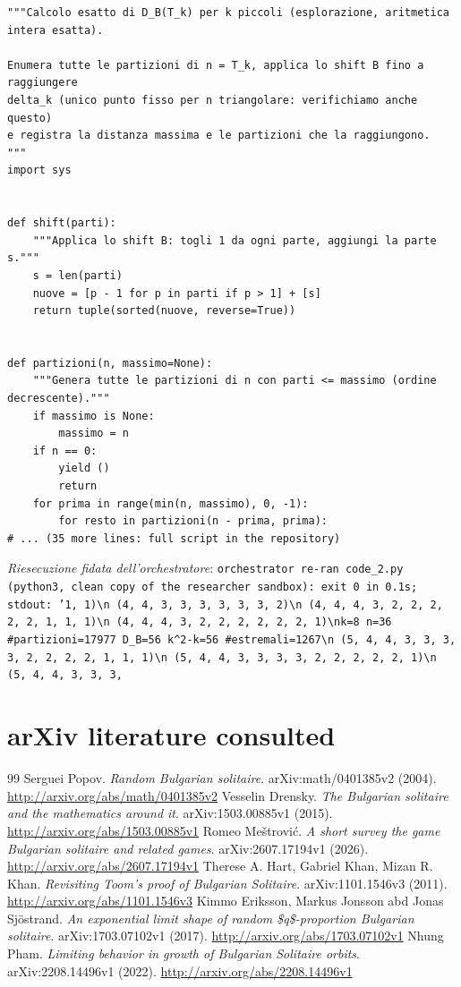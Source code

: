 \documentclass[11pt,a4paper]{article}
\begin{document}
\begin{lstlisting}[caption={attempt\_002 code\_2 [python, rigore exact] — Exhaustive exact computation of d\_B over all partitions of T\_k for k ≤ 9 (run: python calc — approvato dal Referee}]
"""Calcolo esatto di D_B(T_k) per k piccoli (esplorazione, aritmetica intera esatta).

Enumera tutte le partizioni di n = T_k, applica lo shift B fino a raggiungere
delta_k (unico punto fisso per n triangolare: verifichiamo anche questo)
e registra la distanza massima e le partizioni che la raggiungono.
"""
import sys


def shift(parti):
    """Applica lo shift B: togli 1 da ogni parte, aggiungi la parte s."""
    s = len(parti)
    nuove = [p - 1 for p in parti if p > 1] + [s]
    return tuple(sorted(nuove, reverse=True))


def partizioni(n, massimo=None):
    """Genera tutte le partizioni di n con parti <= massimo (ordine decrescente)."""
    if massimo is None:
        massimo = n
    if n == 0:
        yield ()
        return
    for prima in range(min(n, massimo), 0, -1):
        for resto in partizioni(n - prima, prima):
# ... (35 more lines: full script in the repository)
\end{lstlisting}
\noindent\emph{Riesecuzione fidata dell'orchestratore}: \texttt{orchestrator re-ran code\_2.py (python3, clean copy of the researcher sandbox): exit 0 in 0.1s; stdout: '1, 1)\textbackslash{}n    (4, 4, 3, 3, 3, 3, 3, 3, 2)\textbackslash{}n    (4, 4, 4, 3, 2, 2, 2, 2, 2, 1, 1, 1)\textbackslash{}n    (4, 4, 4, 3, 2, 2, 2, 2, 2, 2, 1)\textbackslash{}nk=8 n=36 \#partizioni=17977 D\_B=56 k\textasciicircum{}2-k=56 \#estremali=1267\textbackslash{}n    (5, 4, 4, 3, 3, 3, 3, 2, 2, 2, 2, 1, 1, 1)\textbackslash{}n    (5, 4, 4, 3, 3, 3, 3, 2, 2, 2, 2, 2, 1)\textbackslash{}n    (5, 4, 4, 3, 3, 3,}

\section{arXiv literature consulted}
\begin{thebibliography}{99}
 Serguei Popov. \emph{Random Bulgarian solitaire}. arXiv:math/0401385v2 (2004). \url{http://arxiv.org/abs/math/0401385v2}
 Vesselin Drensky. \emph{The Bulgarian solitaire and the mathematics around it}. arXiv:1503.00885v1 (2015). \url{http://arxiv.org/abs/1503.00885v1}
 Romeo Meštrović. \emph{A short survey the game Bulgarian solitaire and related games}. arXiv:2607.17194v1 (2026). \url{http://arxiv.org/abs/2607.17194v1}
 Therese A. Hart, Gabriel Khan, Mizan R. Khan. \emph{Revisiting Toom's proof of Bulgarian Solitaire}. arXiv:1101.1546v3 (2011). \url{http://arxiv.org/abs/1101.1546v3}
 Kimmo Eriksson, Markus Jonsson abd Jonas Sjöstrand. \emph{An exponential limit shape of random \$q\$-proportion Bulgarian solitaire}. arXiv:1703.07102v1 (2017). \url{http://arxiv.org/abs/1703.07102v1}
 Nhung Pham. \emph{Limiting behavior in growth of Bulgarian Solitaire orbits}. arXiv:2208.14496v1 (2022). \url{http://arxiv.org/abs/2208.14496v1}
\end{thebibliography}
\end{document}

